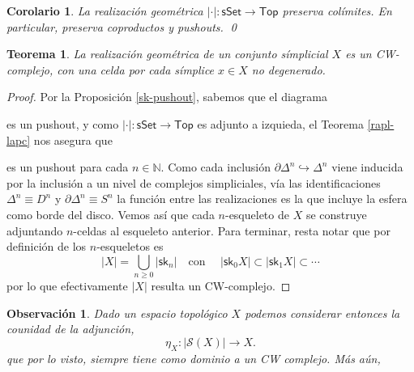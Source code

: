\documentclass[11pt]{report}
\theoremstyle{colored}
\newtheorem{theorem}{Teorema}[section]
\newtheorem{corollary}{Corolario}[section]
\newtheorem{remark}{Observación}[section]
\newcommand{\N}{\mathbb{N}}
\newcommand{\cat}[1]{\mathsf{#1}}
\newcommand{\sk}{\mathsf{sk}}
\renewcommand{\ss}[1]{\Delta^{#1}}
\begin{document}
\begin{corollary} La realización geométrica $| \cdot | : \cat{sSet} \to \cat{Top}$ preserva colímites. En particular, preserva coproductos y pushouts. \qed
\end{corollary}

\begin{theorem} La realización geométrica de un conjunto símplicial $X$ es un CW-complejo, con una celda por cada símplice $x \in X$ no degenerado.
\end{theorem}
\begin{proof} Por la Proposición \ref{sk-pushout}, sabemos que el diagrama
\begin{center}
\end{center}
es un pushout, y como $| \cdot | : \cat{sSet} \to \cat{Top}$ es adjunto a izquieda, el Teorema \ref{rapl-lapc} nos asegura que
\begin{center}
\end{center}
es un pushout para cada $n \in \N$. Como cada inclusión $\partial \ss{n} \hookrightarrow \ss{n}$ viene inducida por la inclusión a un nivel de complejos simpliciales, vía las identificaciones $\ss{n} \equiv D^n$ y $\partial \ss{n} \equiv S^n$ la función entre las realizaciones es la que incluye la esfera como borde del disco. Vemos así que cada $n$-esqueleto de $X$ se construye adjuntando $n$-celdas al esqueleto anterior. Para terminar, resta notar que por definición de los $n$-esqueletos es
\[
|X| = \bigcup_{n \geq 0} |\sk_n| \quad \text{con } \quad |\sk_0 X| \subset |\sk_1 X| \subset  \cdots
\] 
por lo que efectivamente $|X|$ resulta un CW-complejo.
\end{proof}


\begin{remark} Dado un espacio topológico $X$ podemos considerar entonces la counidad de la adjunción, 
\[
\eta_X : |\mathcal{S}(X)|\to X.
\]
que por lo visto, siempre tiene como dominio a un CW complejo. Más aún, 
\end{remark}
\end{document}
